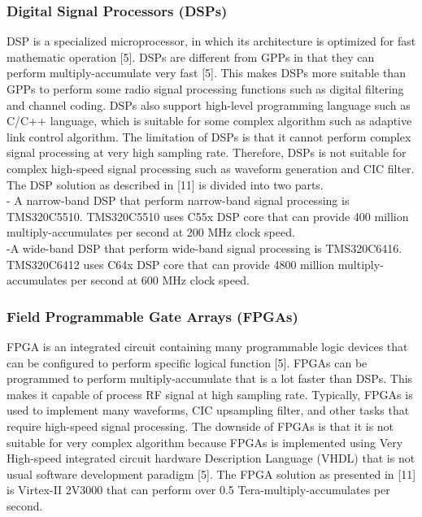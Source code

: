 \documentclass[conference]{IEEEtran}
\begin{document}
\subsubsection{Digital Signal Processors (DSPs)}
DSP is a specialized microprocessor, in which its architecture is optimized for fast mathematic operation [5]. DSPs are different from GPPs in that they can perform multiply-accumulate very fast [5]. This makes DSPs more suitable than GPPs to perform some radio signal processing functions such as digital filtering and channel coding. DSPs also support high-level programming language such as C/C++ language, which is suitable for some complex algorithm such as adaptive link control algorithm. The limitation of DSPs is that it cannot perform complex signal processing at very high sampling rate. Therefore, DSPs is not suitable for complex high-speed signal processing such as waveform generation and CIC filter. \\
The DSP solution as described in [11] is divided into two parts. 
	\\-	A narrow-band DSP that perform narrow-band signal processing is TMS320C5510. TMS320C5510 uses C55x DSP core that can provide 400 million multiply-accumulates per second at 200 MHz clock speed. 
	\\ -A wide-band DSP that perform wide-band signal processing is TMS320C6416. TMS320C6412 uses C64x DSP core that can provide 4800 million multiply-accumulates per second at 600 MHz clock speed. 
\subsubsection{Field Programmable Gate Arrays (FPGAs)}
FPGA is an integrated circuit containing many programmable logic devices that can be configured to perform specific logical function [5]. FPGAs can be programmed to perform multiply-accumulate that is a lot faster than DSPs. This makes it capable of process RF signal at high sampling rate. Typically, FPGAs is used to implement many waveforms, CIC upsampling filter, and other tasks that require high-speed signal processing. The downside of FPGAs is that it is not suitable for very complex algorithm because FPGAs is implemented using Very High-speed integrated circuit hardware Description Language (VHDL) that is not usual software development paradigm [5].
The FPGA solution as presented in [11] is Virtex-II 2V3000 that can perform over 0.5 Tera-multiply-accumulates per second. 
\end{document}
